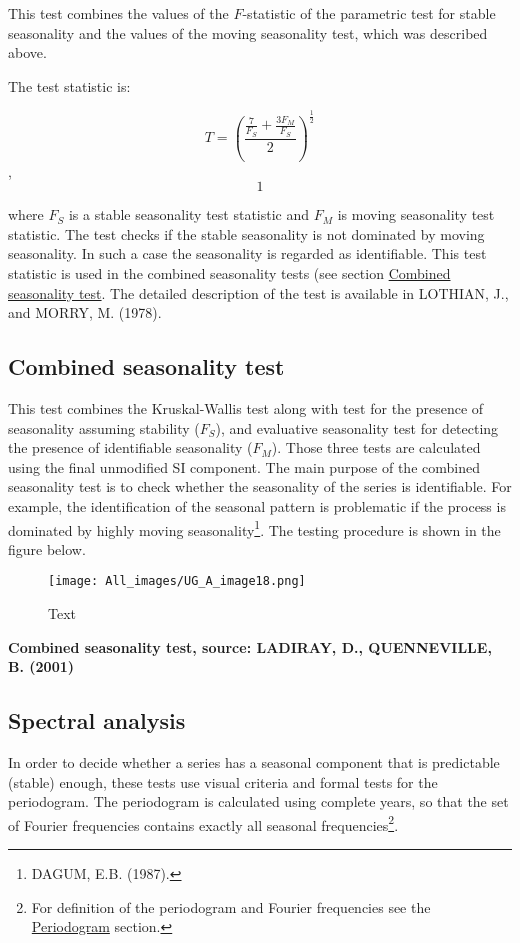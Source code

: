 \documentclass[
]{book}
\begin{document}
This test combines the values of the \(F\)-statistic of the parametric
test for stable seasonality and the values of the moving seasonality
test, which was described above.

The test statistic is:

\[
  T = \left( \frac{\frac{7}{F_{S}} + \frac{3F_{M}}{F_{S}}}{2} \right)^{\frac{1}{2}}
  \], \[1\]

where \(F_{S}\) is a stable seasonality test statistic and \(F_{M}\) is
moving seasonality test statistic. The test checks if the stable
seasonality is not dominated by moving seasonality. In such a case the
seasonality is regarded as identifiable. This test statistic is used in
the combined seasonality tests (see section \href{../theory/Tests_combined.html}{Combined seasonality test}. The detailed description of the test is available in LOTHIAN, J., and MORRY, M. (1978).

\hypertarget{combined-seasonality-test}{%
\subsection{Combined seasonality test}\label{combined-seasonality-test}}

This test combines the Kruskal-Wallis test along with test for the
presence of seasonality assuming stability (\(F_{S}\)), and evaluative
seasonality test for detecting the presence of identifiable seasonality
(\(F_{M}\)). Those three tests are calculated using the final unmodified
SI component. The main purpose of the combined seasonality test is to
check whether the seasonality of the series is identifiable. For
example, the identification of the seasonal pattern is problematic if
the process is dominated by highly moving seasonality\footnote{DAGUM, E.B. (1987).}. The testing
procedure is shown in the figure below.

\begin{figure}
\centering
\texttt{[image: All\_images/UG\_A\_image18.png]}
\caption{Text}
\end{figure}

\textbf{Combined seasonality test, source: LADIRAY, D., QUENNEVILLE, B. (2001)}

\hypertarget{spectral-analysis}{%
\subsection{Spectral analysis}\label{spectral-analysis}}

In order to decide whether a series has a seasonal component that is
predictable (stable) enough, these tests use visual criteria and formal
tests for the periodogram. The periodogram is calculated using complete
years, so that the set of Fourier frequencies contains exactly all
seasonal frequencies\footnote{For definition of the periodogram and Fourier frequencies see the \href{../theory/spectral_periodogram.html}{Periodogram} section.}.
\end{document}
